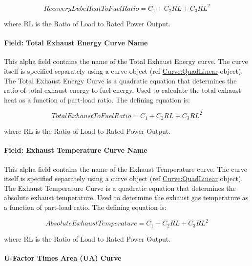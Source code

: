 \begin{equation}
RecoveryLubeHeatToFuelRatio = {C_1} + {C_2}RL + {C_3}R{L^2}
\end{equation}

where RL is the Ratio of Load to Rated Power Output.

\paragraph{Field: Total Exhaust Energy Curve Name}\label{field-total-exhaust-energy-curve-name}

This alpha field contains the name of the Total Exhaust Energy curve. The curve itself is specified separately using a curve object (ref \hyperref[curvequadlinear]{Curve:QuadLinear} object). The Total Exhaust Energy Curve is a quadratic equation that determines the ratio of total exhaust energy to fuel energy. Used to calculate the total exhaust heat as a function of part-load ratio. The defining equation is:

\begin{equation}
TotalExhaustToFuelRatio = {C_1} + {C_2}RL + {C_3}R{L^2}
\end{equation}

where RL is the Ratio of Load to Rated Power Output.

\paragraph{Field: Exhaust Temperature Curve Name}\label{field-exhaust-temperature-curve-name}

This alpha field contains the name of the Exhaust Temperature curve. The curve itself is specified separately using a curve object (ref \hyperref[curvequadlinear]{Curve:QuadLinear} object). The Exhaust Temperature Curve is a quadratic equation that determines the absolute exhaust temperature. Used to determine the exhaust gas temperature as a function of part-load ratio. The defining equation is:

\begin{equation}
AbsoluteExhaustTemperature = {C_1} + {C_2}RL + {C_3}R{L^2}
\end{equation}

where RL is the Ratio of Load to Rated Power Output.

\paragraph{U-Factor Times Area (UA) Curve}\label{u-factor-times-area-ua-curve}

